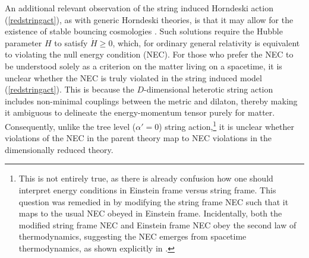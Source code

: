 \documentclass[amsmath,amssymb,11pt]{article}
\begin{document}
An additional relevant observation of the string induced Horndeski action (\ref{redstringact}), as with generic Horndeski theories, is that it may allow for the existence of stable bouncing cosmologies \cite{Qiu:2011cy,Easson:2011zy}. Such solutions require the Hubble parameter $H$ to satisfy $\dot{H}\geq0$, which, for ordinary general relativity is equivalent to violating the null energy condition (NEC). For those who prefer the NEC to be  understood solely as a criterion on the matter living on a spacetime, it is unclear whether the NEC is truly violated in the string induced model (\ref{redstringact}). This is because the $D$-dimensional heterotic string action includes non-minimal couplings between the metric and dilaton, thereby making it ambiguous to delineate the energy-momentum tensor purely for matter. Consequently, unlike the tree level ($\alpha'=0$) string action,\footnote{This is not entirely true, as there is already confusion how one should interpret energy conditions in Einstein frame versus string frame. This question was remedied in \cite{Chatterjee:2012zh} by modifying the string frame NEC such that it maps to the usual NEC obeyed in Einstein frame. Incidentally, both the modified string frame NEC and Einstein frame NEC obey the second law of thermodynamics, suggesting the NEC emerges from spacetime thermodynamics, as shown explicitly in \cite{Parikh:2015ret,Parikh:2016lys}.} it is unclear whether violations of the NEC in the parent theory map to NEC violations in the dimensionally reduced theory. 
\end{document}
